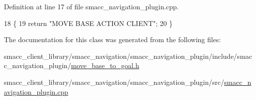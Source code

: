 Definition at line 17 of file smacc\+\_\+navigation\+\_\+plugin.\+cpp.


\begin{DoxyCode}
18 \{
19     \textcolor{keywordflow}{return} \textcolor{stringliteral}{"MOVE BASE ACTION CLIENT"};
20 \}
\end{DoxyCode}


The documentation for this class was generated from the following files\+:\begin{DoxyCompactItemize}
\item 
smacc\+\_\+client\+\_\+library/smacc\+\_\+navigation/smacc\+\_\+navigation\+\_\+plugin/include/smacc\+\_\+navigation\+\_\+plugin/\hyperlink{move__base__to__goal_8h}{move\+\_\+base\+\_\+to\+\_\+goal.\+h}\item 
smacc\+\_\+client\+\_\+library/smacc\+\_\+navigation/smacc\+\_\+navigation\+\_\+plugin/src/\hyperlink{smacc__navigation__plugin_8cpp}{smacc\+\_\+navigation\+\_\+plugin.\+cpp}\end{DoxyCompactItemize}
